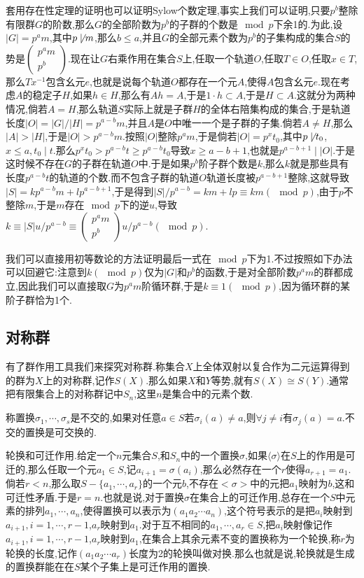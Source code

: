 套用存在性定理的证明也可以证明Sylow个数定理,事实上我们可以证明,只要$p^b$整除有限群$G$的阶数,那么$G$的全部阶数为$p^b$的子群的个数是$\mod p$下余1的.为此,设$|G|=p^am$,其中$p\not\mid m$,那么$b\le a$,并且$G$的全部元素个数为$p^b$的子集构成的集合$S$的势是$\left(\begin{array}{c}
p^am\\
p^b\end{array}\right)$.现在让$G$右乘作用在集合$S$上,任取一个轨道$O$,任取$T\in O$,任取$x\in T$,那么$Tx^{-1}$包含幺元$e$,也就是说每个轨道$O$都存在一个元$A$,使得$A$包含幺元$e$.现在考虑$A$的稳定子$H$,如果$h\in H$,那么有$Ah=A$,于是$1\cdot h\subset A$,于是$H\subset A$.这就分为两种情况,倘若$A=H$,那么轨道$S$实际上就是子群$H$的全体右陪集构成的集合,于是轨道长度$|O|=|G|/|H|=p^{a-b}m$,并且$A$是$O$中唯一一个是子群的子集.倘若$A\not=H$,那么$|A|>|H|$,于是$|O|>p^{a-b}m$.按照$|O|$整除$p^am$,于是倘若$|O|=p^xt_0$,其中$p\not\mid t_0$,$x\le a,t_0\mid t$.那么$p^xt_0>p^{a-b}t\ge p^{a-b}t_0$导致$x\ge a-b+1$,也就是$p^{a-b+1}\mid |O|$.于是这时候不存在$G$的子群在轨道$O$中.于是如果$p^b$阶子群个数是$k$,那么$k$就是那些具有长度$p^{a-b}t$的轨道的个数.而不包含子群的轨道$O$轨道长度被$p^{a-b+1}$整除,这就导致$|S|=kp^{a-b}m+lp^{a-b+1}$,于是得到$|S|/p^{a-b}=km+lp\equiv km(\mod p)$,由于$p$不整除$m$,于是$m$存在$\mod p$下的逆$u$,导致$k\equiv |S|u/p^{a-b}\equiv\left(\begin{array}{c}
p^am\\
p^b\end{array}\right)u/p^{a-b}(\mod p)$.

我们可以直接用初等数论的方法证明最后一式在$\mod p$下为1.不过按照如下办法可以回避它:注意到$k(\mod p)$仅为$|G|$和$p^b$的函数,于是对全部阶数$p^am$的群都成立,因此我们可以直接取$G$为$p^am$阶循环群,于是$k\equiv1(\mod p)$,因为循环群的某阶子群恰为1个.
\newpage
\subsection{对称群}

有了群作用工具我们来探究对称群.称集合$X$上全体双射以复合作为二元运算得到的群为$X$上的对称群,记作$S(X)$.那么如果$X$和$Y$等势,就有$S(X)\cong S(Y)$.通常把有限集合上的对称群记中$S_n$,这里$n$是集合中的元素个数.

称置换$\sigma_1,\cdots,\sigma_s$是不交的,如果对任意$a\in S$若$\sigma_i(a)\not=a$,则$\forall j\not=i$有$\sigma_j(a)=a$.不交的置换是可交换的.

轮换和可迁作用.给定一个$n$元集合$S$,和$S_n$中的一个置换$\sigma$,如果$\langle\sigma\rangle$在$S$上的作用是可迁的,那么任取一个元$a_1\in S$,记$a_{i+1}=\sigma(a_i)$,那么必然存在一个$r$使得$a_{r+1}=a_1$.倘若$r<n$,那么取$S-\{a_1,\cdots,a_r\}$的一个元$b$,不存在$<\sigma>$中的元把$a_1$映射为$b$,这和可迁性矛盾.于是$r=n$.也就是说,对于置换$\sigma$在集合上的可迁作用,总存在一个$S$中元素的排列$a_1,\cdots,a_n$,使得置换可以表示为$\left(a_1a_2\cdots a_n\right)$,这个符号表示的是把$a_i$映射到$a_ {i+1},i=1,\cdots,r-1$,$a_r$映射到$a_1$.对于互不相同的$a_1,\cdots,a_r\in S$,把$a_i$映射像记作$a_ {i+1},i=1,\cdots,r-1$,$a_r$映射到$a_1$,在集合上其余元素不变的置换称为一个轮换,称$r$为轮换的长度,记作$\left(a_1a_2\cdots a_r\right)$长度为2的轮换叫做对换.那么也就是说,轮换就是生成的置换群能在在$S$某个子集上是可迁作用的置换.

